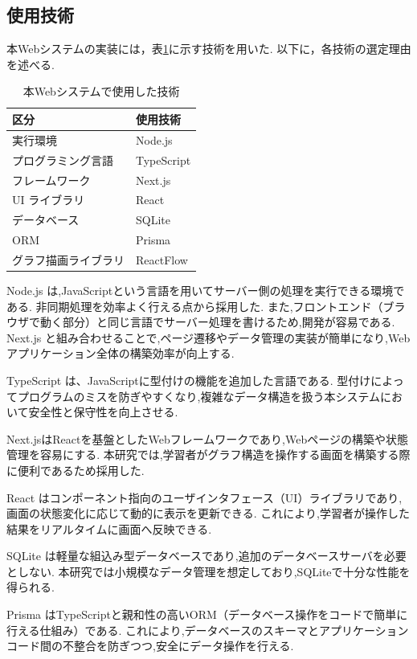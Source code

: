 \documentclass[paper]{ieicej}
\begin{document}
\subsection{使用技術}
本Webシステムの実装には，表\ref{tab:tech}に示す技術を用いた.
以下に，各技術の選定理由を述べる.
\begin{table}[h]
  \centering
  \caption{本Webシステムで使用した技術}
  \label{tab:tech}
  \begin{tabular}{ll}
    \hline
    区分 & 使用技術 \\ \hline
    実行環境 & Node.js \\
    プログラミング言語 & TypeScript \\
    フレームワーク & Next.js \\
    UI ライブラリ & React \\
    データベース & SQLite \\
    ORM & Prisma \\
    グラフ描画ライブラリ & ReactFlow \\
    \hline
  \end{tabular}
\end{table}

Node.js\cite{nodejs} は,JavaScriptという言語を用いてサーバー側の処理を実行できる環境である.
非同期処理を効率よく行える点から採用した.
また,フロントエンド（ブラウザで動く部分）と同じ言語でサーバー処理を書けるため,開発が容易である.
Next.js\cite{Next.js} と組み合わせることで,ページ遷移やデータ管理の実装が簡単になり,Webアプリケーション全体の構築効率が向上する.

TypeScript\cite{TypeScript} は、JavaScriptに型付けの機能を追加した言語である.
型付けによってプログラムのミスを防ぎやすくなり,複雑なデータ構造を扱う本システムにおいて安全性と保守性を向上させる.

Next.jsはReact\cite{React}を基盤としたWebフレームワークであり,Webページの構築や状態管理を容易にする.
本研究では,学習者がグラフ構造を操作する画面を構築する際に便利であるため採用した.

React はコンポーネント指向のユーザインタフェース（UI）ライブラリであり,
画面の状態変化に応じて動的に表示を更新できる.
これにより,学習者が操作した結果をリアルタイムに画面へ反映できる.

SQLite\cite{sqlite} は軽量な組込み型データベースであり,追加のデータベースサーバを必要としない.
本研究では小規模なデータ管理を想定しており,SQLiteで十分な性能を得られる.

Prisma\cite{Prisma} はTypeScriptと親和性の高いORM（データベース操作をコードで簡単に行える仕組み）である.
これにより,データベースのスキーマとアプリケーションコード間の不整合を防ぎつつ,安全にデータ操作を行える.
\end{document}
